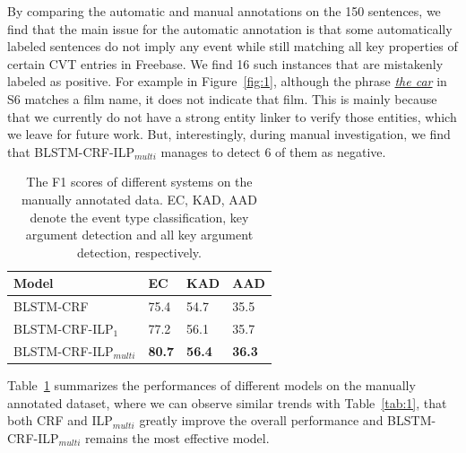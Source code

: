 By comparing the automatic and manual annotations on the 150 sentences, we find that
the main issue for the automatic annotation is that some automatically labeled sentences
do not imply any event while still matching all key properties of certain CVT entries in Freebase.
We find 16 such instances that are mistakenly labeled as positive.
For example in Figure~\ref{fig:1}, although the phrase \underline{\emph{the car}} in S6 matches a film name,
it does not indicate that film. %
This is mainly because that we currently do not have a strong entity linker to verify those entities, which we leave for
future work.
But, interestingly,
during manual investigation,
we find that BLSTM-CRF-ILP$_{multi}$ manages to detect 6 of them as negative.


\begin{table}[h]
\small
\centering
\begin{tabular}{|l|p{0.8cm}<{\centering}|p{0.8cm}<{\centering}|p{0.8cm}<{\centering}|} \hline
	Model & EC & KAD & AAD \\ \hline
	BLSTM-CRF & 75.4 & 54.7 & 35.5 \\ \hline
	BLSTM-CRF-ILP$_{1}$ & 77.2 & 56.1 & 35.7 \\ \hline
	BLSTM-CRF-ILP$_{multi}$ & \textbf{80.7} & \textbf{56.4} & \textbf{36.3} \\ \hline
\end{tabular}
\caption{The F1 scores of different systems on the manually annotated data. EC, KAD, AAD denote the event type classification, key argument detection and all key argument detection, respectively. \label{tab:2}}
\end{table}

Table~\ref{tab:2} summarizes the performances of different models on the manually annotated dataset, where we can observe similar trends with Table~\ref{tab:1}, that
both CRF and ILP$_{multi}$ greatly improve the overall performance and
BLSTM-CRF-ILP$_{multi}$ remains the most effective model. %


